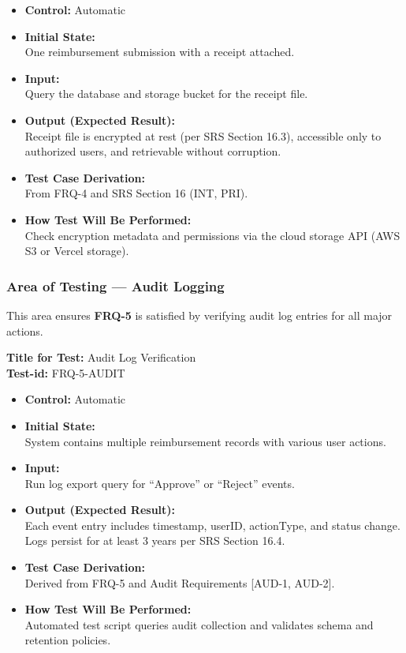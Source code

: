 \documentclass[12pt, titlepage]{article}
\begin{document}
\begin{itemize}
    \item \textbf{Control:} Automatic
    \item \textbf{Initial State:} \\
    One reimbursement submission with a receipt attached.
    \item \textbf{Input:} \\
    Query the database and storage bucket for the receipt file.
    \item \textbf{Output (Expected Result):} \\
    Receipt file is encrypted at rest (per SRS Section 16.3), accessible only to authorized users, and retrievable without corruption.
    \item \textbf{Test Case Derivation:} \\
    From FRQ-4 and SRS Section 16 (INT, PRI).
    \item \textbf{How Test Will Be Performed:} \\
    Check encryption metadata and permissions via the cloud storage API (AWS S3 or Vercel storage).
\end{itemize}

\subsubsection{Area of Testing — Audit Logging}

This area ensures \textbf{FRQ-5} is satisfied by verifying audit log entries for all major actions.

\textbf{Title for Test:} Audit Log Verification \\
\textbf{Test-id:} FRQ-5-AUDIT

\begin{itemize}
    \item \textbf{Control:} Automatic
    \item \textbf{Initial State:} \\
    System contains multiple reimbursement records with various user actions.
    \item \textbf{Input:} \\
    Run log export query for ``Approve'' or ``Reject'' events.
    \item \textbf{Output (Expected Result):} \\
    Each event entry includes timestamp, userID, actionType, and status change. Logs persist for at least 3 years per SRS Section 16.4.
    \item \textbf{Test Case Derivation:} \\
    Derived from FRQ-5 and Audit Requirements [AUD-1, AUD-2].
    \item \textbf{How Test Will Be Performed:} \\
    Automated test script queries audit collection and validates schema and retention policies.
\end{itemize}
\end{document}
